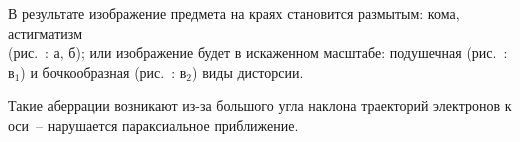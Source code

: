 В результате изображение предмета на краях становится размытым: кома,
астигматизм\\ (рис.~: а, б); или изображение будет в искаженном
масштабе: подушечная (рис.~: в\( _1 \)) и бочкообразная
(рис.~: в\( _2 \)) виды дисторсии.

Такие аберрации возникают из-за большого угла наклона траекторий электронов к
оси~-- нарушается параксиальное приближение.
